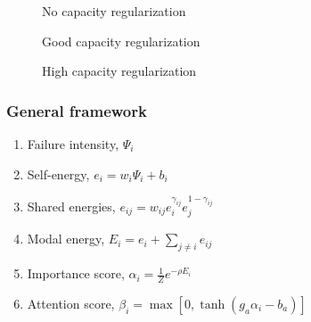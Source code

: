 \documentclass[10pt]{beamer}
\begin{document}
\begin{frame}
\begin{multicols}{2}
\begin{figure}
\begin{overprint}
\end{overprint}
\caption{No capacity regularization}
\vspace*{-0.9cm}\caption{Good capacity regularization}
\vspace*{-0.9cm}\caption{High capacity regularization}
\end{figure}
\end{multicols}
\end{frame}

\begin{frame}
\frametitle{General framework}
\begin{enumerate}
\item Failure intensity, $\Psi_i$ \vspace*{0.35cm}
\item Self-energy, $e_i = w_i\Psi_i + b_i$ \vspace*{0.35cm}
\item Shared energies, $e_{ij} = w_{ij}e_i^{\gamma_{ij}}e_j^{1-\gamma_{ij}}$ \vspace*{0.35cm}
\item Modal energy, $E_i = e_i + \sum_{j\neq i} e_{ij}$ \vspace*{0.35cm}
\item Importance score, $\alpha_i = \frac{1}{Z}e^{-\rho E_i}$ \vspace*{0.35cm}
\item Attention score, $\beta_i = \max[0, \tanh(g_a\alpha_i - b_a)]$ \vspace*{0.35cm}
\end{enumerate}
\end{frame}
\end{document}
